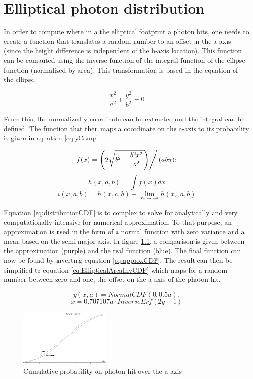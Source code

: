 \chapter{Elliptical photon distribution}
\label{EllipticalPhotonDistribution}

In order to compute where in a the elliptical footprint a photon hits, one needs to create a function that translates a random number to an offset in the a-axis (since the height difference is independent of the b-axis location). This function can be computed using the inverse function of the integral function of the ellipse function (normalized by area). This transformation is based in the equation of the ellipse.

\begin{equation}
	\frac{x^2}{a^2}+\frac{y^2}{b^2}=0
\end{equation}

From this, the normalized y coordinate can be extracted and the integral can be defined. The function that then maps a coordinate on the a-axis to its probability is given in equation \ref{eq:yComp}.


\begin{equation}
	f(x) = \left. \left(2 \sqrt{b^2-\frac{b^2 x^2}{a^2}}\right)\right/(a b \pi);
	\label{eq:yComp}
\end{equation}
\begin{equation}
	h(x,a,b) = \int f(x) dx
\end{equation}
\begin{equation}
	i(x,a,b) = h(x,a,b)-\lim_{x_2\to-a} h(x_2,a,b)
	\label{eq:distributionCDF}
\end{equation}

Equation \ref{eq:distributionCDF} is to complex to solve for analytically and very computationally intensive for numerical approximation. To that purpose, an approximation is used in the form of a normal function with zero variance and a mean based on the semi-major axis. In figure \ref{fig:CDFcomparison}, a comparison is given between the approximation (purple) and the real function (blue). The final function can now be found by inverting equation \ref{eq:approxCDF}. The result can then be simplified to equation \ref{eq:EllipticalAreaInvCDF} which maps for a random number between zero and one, the offset on the a-axis of the photon hit.

\begin{equation}
	y(x,a) = NormalCDF(0, 0.5a);
	\label{eq:approxCDF}
\end{equation}
\begin{equation}
	x = 0.707107 a \cdot InverseErf(2y-1)
	\label{eq:EllipticalAreaInvCDF}
\end{equation}

\begin{figure}[ht]
	\centering
	\includegraphics[width=0.4\textwidth]{chapters/img/ellipticalArea.png}%
		\caption{Cumulative probability on photon hit over the a-axis}%
		\label{fig:CDFcomparison}
\end{figure}